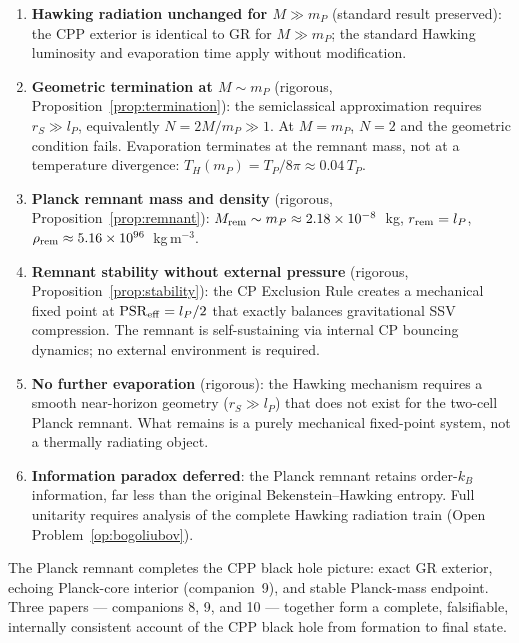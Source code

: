 \documentclass[12pt]{article}
\newcommand{\lP}{l_P}
\newcommand{\mP}{m_P}
\newcommand{\TP}{T_P}
\newcommand{\rS}{r_S}
\newcommand{\PSR}{\mathrm{PSR}}
\newcommand{\TH}{T_H}
\begin{document}
\begin{enumerate}
  \item \textbf{Hawking radiation unchanged for $M \gg \mP$}
    (standard result preserved): the CPP exterior is identical to GR
    for $M \gg \mP$; the standard Hawking luminosity and evaporation
    time apply without modification.

  \item \textbf{Geometric termination at $M \sim \mP$}
    (rigorous, Proposition~\ref{prop:termination}): the
    semiclassical approximation requires $\rS \gg \lP$, equivalently
    $N = 2M/\mP \gg 1$.  At $M = \mP$, $N = 2$ and the geometric
    condition fails.  Evaporation terminates at the remnant mass,
    not at a temperature divergence: $\TH(\mP) = \TP/8\pi \approx 0.04\,\TP$.

  \item \textbf{Planck remnant mass and density}
    (rigorous, Proposition~\ref{prop:remnant}):
    $M_{\rm rem} \sim \mP \approx 2.18\times10^{-8}$~kg,
    $r_{\rm rem} = \lP$,
    $\rho_{\rm rem} \approx 5.16\times10^{96}$~kg\,m$^{-3}$.

  \item \textbf{Remnant stability without external pressure}
    (rigorous, Proposition~\ref{prop:stability}): the CP Exclusion
    Rule creates a mechanical fixed point at $\PSR_{\rm eff} = \lP/2$
    that exactly balances gravitational SSV compression.  The remnant
    is self-sustaining via internal CP bouncing dynamics; no external
    environment is required.

  \item \textbf{No further evaporation} (rigorous): the Hawking
    mechanism requires a smooth near-horizon geometry ($\rS \gg \lP$)
    that does not exist for the two-cell Planck remnant.  What remains
    is a purely mechanical fixed-point system, not a thermally
    radiating object.

  \item \textbf{Information paradox deferred}: the Planck remnant
    retains order-$k_B$ information, far less than the original
    Bekenstein--Hawking entropy.  Full unitarity requires analysis
    of the complete Hawking radiation train (Open
    Problem~\ref{op:bogoliubov}).
\end{enumerate}

The Planck remnant completes the CPP black hole picture: exact GR
exterior, echoing Planck-core interior (companion~9), and stable
Planck-mass endpoint.  Three papers — companions 8, 9, and 10 —
together form a complete, falsifiable, internally consistent account
of the CPP black hole from formation to final state.
\end{document}
